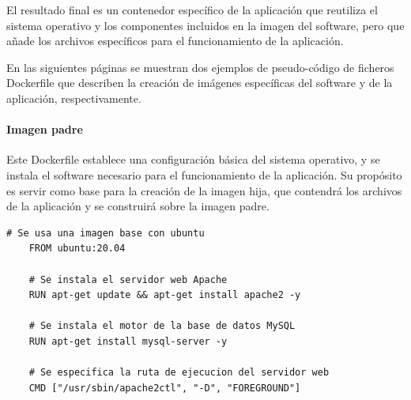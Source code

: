                 El resultado final es un contenedor específico de la aplicación que reutiliza el sistema operativo y los componentes incluidos en la imagen del software, pero que añade los archivos específicos para el funcionamiento de la aplicación.

                En las siguientes páginas se muestran dos ejemplos de pseudo-código de ficheros Dockerfile que describen la creación de imágenes específicas del software y de la aplicación, respectivamente.

                \newpage

                \paragraph{Imagen padre} Este Dockerfile establece una configuración básica del sistema operativo, y se instala el software necesario para el funcionamiento de la aplicación. Su propósito es servir como base para la creación de la imagen hija, que contendrá los archivos de la aplicación y se construirá sobre la imagen padre.
                \\

                \begin{lstlisting}[style=dockerfile_style, caption={Dockerfile de una imagen principal (padre)}]
    # Se usa una imagen base con ubuntu
    FROM ubuntu:20.04
    
    # Se instala el servidor web Apache
    RUN apt-get update && apt-get install apache2 -y
    
    # Se instala el motor de la base de datos MySQL
    RUN apt-get install mysql-server -y
    
    # Se especifica la ruta de ejecucion del servidor web
    CMD ["/usr/sbin/apache2ctl", "-D", "FOREGROUND"]
                \end{lstlisting}

